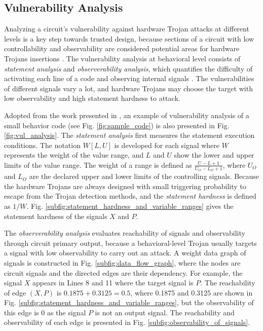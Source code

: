 \documentclass[10pt,journal, compsoc]{IEEEtran}
\begin{document}
\subsection{Vulnerability Analysis}

Analyzing a circuit's vulnerability against hardware Trojan attacks at different levels is a key step towards trusted design, because sections of a circuit with low controllability and observability are considered potential areas for hardware Trojans insertions \cite{article:MT, article:JC,article:YD}. The vulnerability analysis at behavioral level consists of \textit{statement analysis} and \textit{observerability analysis}, which quantifies the difficulty of activating each line of a code and observing internal signals \cite{conference:HS}. The vulnerabilities of different signals vary a lot, and hardware Trojans may choose the target with low observability and high statement hardness to attack.

Adopted from the work presented in \cite{conference:HS}, an example of vulnerability analysis of a small behavior code (see Fig. \ref{fig:sample_code}) is also presented in Fig. \ref{fig:vul_analysis}. The \textit{statement analysis} first measures the statement execution conditions. The notation $W[L,U]$ is developed for each signal where $W$ represents the weight of the value range, and $L$ and $U$ show the lower and upper limits of the value range. The weight of a range is defined as $\frac{U-L+1}{U_O-L_O+1}$, where $U_O$ and $L_O$ are the declared upper and lower limits of the controlling signals. Because the hardware Trojans are always designed with small triggering probability to escape from the Trojan detection methods, and the \textit{statement hardness} is defined as $1/W$. Fig. \ref{subfig:statement_hardness_and_variable_ranges} gives the statement hardness of the signals $X$ and $P$.

The \textit{observerability analysis} evaluates reachability of signals and observability through circuit primary output, because a behavioral-level Trojan usually targets a signal with low observability to carry out an attack. A weight data graph of signals is constructed in Fig. \ref{subfig:data_flow_graph}, where the nodes are circuit signals and the directed edges are their dependency. For example, the signal $X$ appears in Lines 8 and 11 where the target signal is $P$. The reachability of edge $(X,P)$ is $0.1875+0.3125=0.5$, where 0.1875 and 0.3125 are shown in Fig. \ref{subfig:statement_hardness_and_variable_ranges}, but the observability of this edge is 0 as the signal $P$ is not an output signal. The reachability and observability of each edge is presented in Fig. \ref{subfig:observability_of_signals}.
\end{document}
